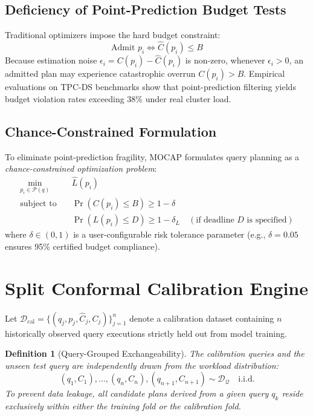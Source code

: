 \documentclass[11pt,a4paper]{article}
\newtheorem{definition}{Definition}
\begin{document}
\subsection{Deficiency of Point-Prediction Budget Tests}
Traditional optimizers impose the hard budget constraint:
\begin{equation}
    \text{Admit } p_i \iff \hat{C}(p_i) \le B
\end{equation}
Because estimation noise $\epsilon_i = C(p_i) - \hat{C}(p_i)$ is non-zero, whenever $\epsilon_i > 0$, an admitted plan may experience catastrophic overrun $C(p_i) > B$. Empirical evaluations on TPC-DS benchmarks show that point-prediction filtering yields budget violation rates exceeding 38\% under real cluster load.

\subsection{Chance-Constrained Formulation}
To eliminate point-prediction fragility, MOCAP formulates query planning as a \emph{chance-constrained optimization problem}:
\begin{equation}
\label{eq:chance_constrained}
\begin{aligned}
    \min_{p_i \in \mathcal{P}(q)} \quad & \hat{L}(p_i) \\
    \text{subject to} \quad & \Pr\left(C(p_i) \le B\right) \ge 1 - \delta \\
    & \Pr\left(L(p_i) \le D\right) \ge 1 - \delta_L \quad (\text{if deadline } D \text{ is specified})
\end{aligned}
\end{equation}
where $\delta \in (0, 1)$ is a user-configurable risk tolerance parameter (e.g., $\delta = 0.05$ ensures 95\% certified budget compliance).

\section{Split Conformal Calibration Engine}

Let $\mathcal{D}_{\text{cal}} = \{(q_j, p_j, \hat{C}_j, C_j)\}_{j=1}^n$ denote a calibration dataset containing $n$ historically observed query executions strictly held out from model training.

\begin{definition}[Query-Grouped Exchangeability]
The calibration queries and the unseen test query are independently drawn from the workload distribution:
\begin{equation}
    (q_1, C_1), \dots, (q_n, C_n), (q_{n+1}, C_{n+1}) \sim \mathcal{D}_{\mathcal{Q}} \quad \text{i.i.d.}
\end{equation}
To prevent data leakage, all candidate plans derived from a given query $q_k$ reside exclusively within either the training fold or the calibration fold.
\end{definition}
\end{document}
